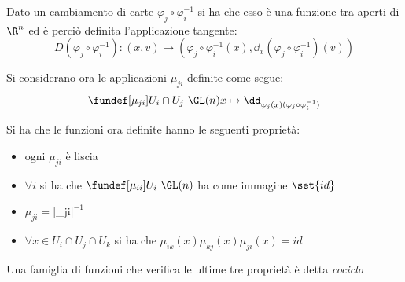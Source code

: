 \begin{oss}
Dato un cambiamento di carte $\varphi _j \circ \varphi _i ^{-1}$ si ha che esso è una funzione tra aperti di $\R ^n$ ed è perciò definita l'applicazione tangente:
\begin{equation*}
D(\varphi _j \circ \varphi _i ^{-1}): (x,v) \mapsto (\varphi _j \circ \varphi _i ^{-1}(x), \dd_x(\varphi _j \circ \varphi _i ^{-1})(v))
\end{equation*}
\end{oss}

Si considerano ora le applicazioni $\mu_{ji}$ definite come segue:
\begin{gather*}
\fundef[\mu_{ji}]{U_i\cap U_j~}{\GL(n)}
x \mapsto \dd_{\varphi_j(x)(\varphi _j \circ \varphi _i ^{-1})}
\end{gather*}

\begin{oss}
Si ha che le funzioni ora definite hanno le seguenti proprietà:
\begin{itemize}
\item ogni $\mu_{ji}$ è liscia
\item $\forall i$ si ha che $\fundef[\mu_{ii}]{U_i~}{\GL(n)}$ ha come immagine $\set{id}$
\item $\mu_{ji} = [$\mu_{ji}$]^{-1}$
\item $\forall x \in U_i\cap U_j\cap U_k$ si ha che $\mu_{ik}(x)\mu_{kj}(x)\mu_{ji}(x) = id$
\end{itemize}
Una famiglia di funzioni che verifica le ultime tre proprietà è detta \emph{cociclo}
\end{oss}

